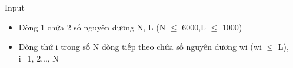 Input
\begin{itemize}
	\item     Dòng 1 chứa 2 số nguyên dương N, L (N $\le$ 6000,L $\le$ 1000)   
	\item     Dòng thứ i trong số N dòng tiếp theo chứa số nguyên dương wi (wi $\le$ L), i=1, 2,.., N   
\end{itemize}